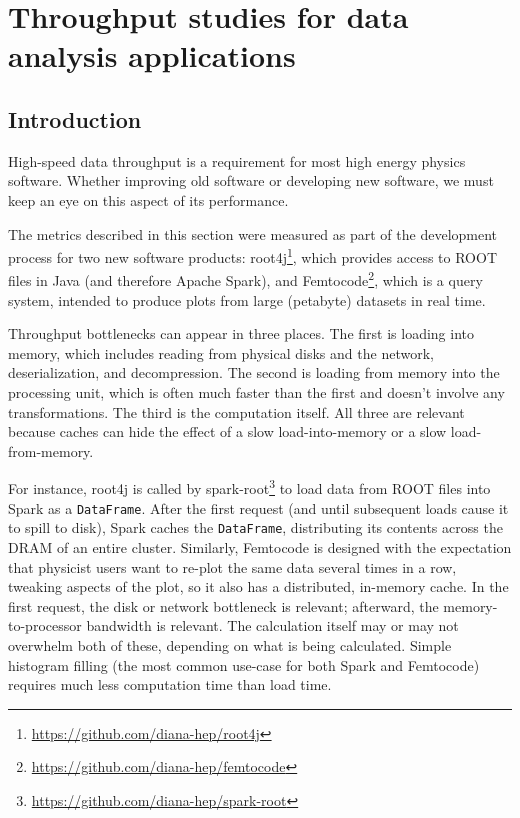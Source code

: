 \documentclass[12pt]{article}
\begin{document}
\section*{Throughput studies for data analysis applications}

\subsection*{Introduction}

High-speed data throughput is a requirement for most high energy physics software. Whether improving old software or developing new software, we must keep an eye on this aspect of its performance.

The metrics described in this section were measured as part of the development process for two new software products: root4j\footnote{\url{https://github.com/diana-hep/root4j}}, which provides access to ROOT files in Java (and therefore Apache Spark), and Femtocode\footnote{\url{https://github.com/diana-hep/femtocode}}, which is a query system, intended to produce plots from large (petabyte) datasets in real time.

Throughput bottlenecks can appear in three places. The first is loading into memory, which includes reading from physical disks and the network, deserialization, and decompression. The second is loading from memory into the processing unit, which is often much faster than the first and doesn't involve any transformations. The third is the computation itself. All three are relevant because caches can hide the effect of a slow load-into-memory or a slow load-from-memory.

For instance, root4j is called by spark-root\footnote{\url{https://github.com/diana-hep/spark-root}} to load data from ROOT files into Spark as a {\tt DataFrame}. After the first request (and until subsequent loads cause it to spill to disk), Spark caches the {\tt DataFrame}, distributing its contents across the DRAM of an entire cluster. Similarly, Femtocode is designed with the expectation that physicist users want to re-plot the same data several times in a row, tweaking aspects of the plot, so it also has a distributed, in-memory cache. In the first request, the disk or network bottleneck is relevant; afterward, the memory-to-processor bandwidth is relevant. The calculation itself may or may not overwhelm both of these, depending on what is being calculated. Simple histogram filling (the most common use-case for both Spark and Femtocode) requires much less computation time than load time.
\end{document}
